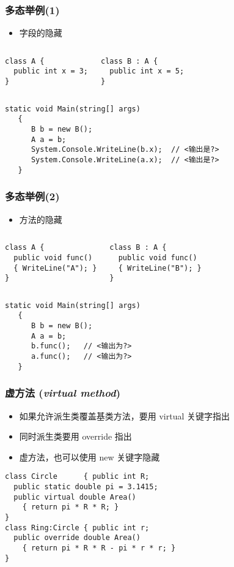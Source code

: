 \begin{frame}[fragile]
\frametitle{多态举例(1)}
\begin{itemize}
\item 字段的隐藏
\end{itemize}
\begin{columns}
\begin{lstlisting}
class A {
  public int x = 3;
}
\end{lstlisting}
\begin{lstlisting}
class B : A {
  public int x = 5;
}
\end{lstlisting}
\end{columns}
\begin{lstlisting}[escapeinside=<>]
   static void Main(string[] args)
   {
      B b = new B();
      A a = b;
      System.Console.WriteLine(b.x);  // <输出是?>
      System.Console.WriteLine(a.x);  // <输出是?>
   }
\end{lstlisting}
\end{frame}

\begin{frame}[fragile]
\frametitle{多态举例(2)}
\begin{itemize}
\item 方法的隐藏
\end{itemize}
\begin{columns}
\begin{lstlisting}
class A {
  public void func()
  { WriteLine("A"); }
}
\end{lstlisting}
\begin{lstlisting}
class B : A {
  public void func()
  { WriteLine("B"); }
}
\end{lstlisting}
\end{columns}
\begin{lstlisting}[escapeinside=<>]
   static void Main(string[] args)
   {
      B b = new B();
      A a = b;
      b.func();   // <输出为?>
      a.func();   // <输出为?>
   }
\end{lstlisting}
\end{frame}


\begin{frame}[fragile]
\frametitle{虚方法 (\textit{virtual method})}
\begin{itemize}
\item 如果允许派生类{\redwarn 覆盖}基类方法，要用 virtual 关键字指出
\item 同时派生类要用 override 指出
\item 虚方法，也可以使用 new 关键字隐藏
\end{itemize}
\begin{lstlisting}
class Circle      { public int R;
  public static double pi = 3.1415;
  public virtual double Area()
    { return pi * R * R; }
}
class Ring:Circle { public int r;
  public override double Area()
    { return pi * R * R - pi * r * r; }
}
\end{lstlisting}
\end{frame}

